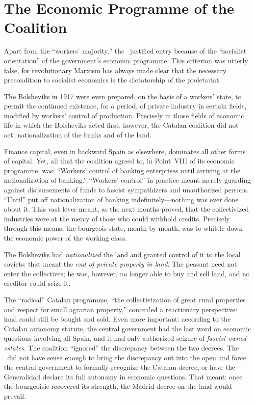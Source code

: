 \section{The Economic Programme of the Coalition}

Apart from the ``workers’ majority,'' the \POUM\ justified entry because of the ``socialist orientation'' of the government’s economic programme. This criterion was utterly false, for revolutionary Marxism has always made clear that the necessary precondition to socialist economics is the dictatorship of the proletariat.

The Bolsheviks in 1917 were even prepared, on the basis of a workers’ state, to permit the continued existence, for a period, of private industry in certain fields, modified by workers’ control of production. Precisely in those fields of economic life in which the Bolsheviks acted first, however, the Catalan coalition did not act: nationalization of the banks and of the land.

Finance capital, even in backward Spain as elsewhere, dominates all other forms of capital. Yet, all that the coalition agreed to, in Point~VIII of its economic programme, was: ``Workers' control of banking enterprises until arriving at the nationalization of banking.'' ``Workers' control'' in practice meant merely guarding against disbursements of funds to fascist sympathizers and unauthorized persons. ``Until'' put off nationalization of banking indefinitely---nothing was ever done about it. This vast lever meant, as the next months proved, that the collectivized industries were at the mercy of those who could withhold credits. Precisely through this means, the bourgeois state, month by month, was to whittle down the economic power of the working class.

The Bolsheviks had \emph{nationalized} the land and granted control of it to the local soviets: that meant the \emph{end of private property in land}. The peasant need not enter the collectives; he was, however, no longer able to buy and sell land, and no creditor could seize it.

The ``radical'' Catalan programme, ``the collectivization of great rural properties and respect for small agrarian property,'' concealed a reactionary perspective: land could still be bought and sold. Even more important: according to the Catalan autonomy statute, the central government had the last word on economic questions involving all Spain, and it had only authorized seizure of \emph{fascist-owned estates}. The coalition ``ignored'' the discrepancy between the two decrees. The \POUM\ did not have sense enough to bring the discrepancy out into the open and force the central government to formally recognize the Catalan decree, or have the Generalidad declare its full autonomy in economic questions. That meant: once the bourgeoisie recovered its strength, the Madrid decree on the land would prevail.

